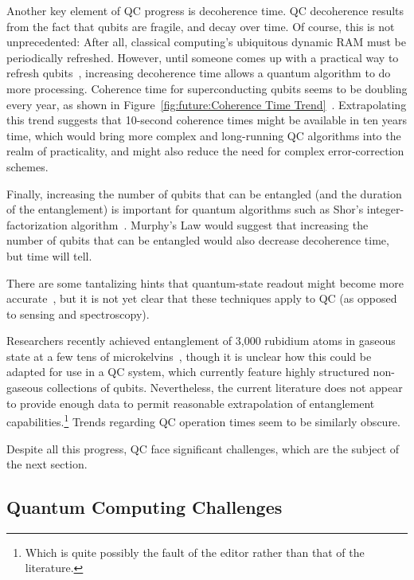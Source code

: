 Another key element of QC progress is decoherence time.
QC decoherence results from the fact that qubits are fragile, and
decay over time.
Of course, this is not unprecedented: After all, classical computing's
ubiquitous dynamic RAM must be periodically refreshed.
However, until someone comes up with a practical way to refresh
qubits~\cite{GiorgioColangelo2017QC-SpinAngleAmplitude},
increasing decoherence time allows a quantum algorithm to do more
processing.
Coherence time for superconducting qubits seems to be doubling every year,
as shown in
Figure~\ref{fig:future:Coherence Time Trend}~\cite{IBM2016QuantumExperience}.
Extrapolating this trend suggests that 10-second coherence times might
be available in ten years time, which would bring more complex and
long-running QC algorithms into the realm of practicality, and might
also reduce the need for complex error-correction schemes.

Finally, increasing the number of qubits that can be
entangled (and the duration of the entanglement) is important for
quantum algorithms such as Shor's integer-factorization
algorithm~\cite{Shor:1997:PAP:264393.264406,Kendon:2006:ERS:2011698.2011704}.
Murphy's Law would suggest that increasing the number of qubits that
can be entangled would also decrease decoherence time, but time will tell.

There are some tantalizing hints that quantum-state readout might become
more accurate~\cite{GiorgioColangelo2017QC-SpinAngleAmplitude},
but it is not yet clear that these techniques apply to QC
(as opposed to sensing and spectroscopy).

Researchers recently achieved entanglement of 3,000
rubidium atoms in gaseous state at a few tens of
microkelvins~\cite{RobertMcConnell2015QC-Entangle3000Atoms},
though it is unclear how this could be adapted for use in
a QC system, which currently feature highly structured non-gaseous
collections of qubits.
Nevertheless, the current literature does not appear to provide enough
data to permit reasonable extrapolation of entanglement capabilities.\footnote{
	Which is quite possibly the fault of the editor rather than that
	of the literature.}
Trends regarding QC operation times seem to be similarly obscure.

Despite all this progress, QC face significant challenges, which are
the subject of the next section.

\subsection{Quantum Computing Challenges}
\label{sec:future:Quantum Computing Challenges}

